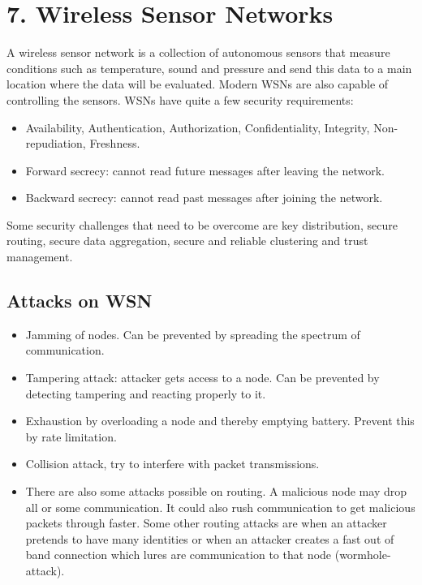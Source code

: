 \documentclass{article}
\begin{document}
\section*{7. Wireless Sensor Networks}
A wireless sensor network is a collection of autonomous sensors that measure conditions such as temperature, sound and pressure and send this data to a main location where the data will be evaluated. Modern WSNs are also capable of controlling the sensors. WSNs have quite a few security requirements:

\begin{itemize}
\item Availability, Authentication, Authorization, Confidentiality, Integrity, Non-repudiation, Freshness.
\item Forward secrecy: cannot read future messages after leaving the network.
\item Backward secrecy: cannot read past messages after joining the network.
\end{itemize}

Some security challenges that need to be overcome are key distribution, secure routing, secure data aggregation, secure and reliable clustering and trust management. 

\subsection*{Attacks on WSN~\cite{wang2006survey}}

\begin{itemize}
\item Jamming of nodes. Can be prevented by spreading the spectrum of communication.
\item Tampering attack: attacker gets access to a node. Can be prevented by detecting tampering and reacting properly to it.
\item Exhaustion by overloading a node and thereby emptying battery. Prevent this by rate limitation.
\item Collision attack, try to interfere with packet transmissions.
\item There are also some attacks possible on routing. A malicious node may drop all or some communication. It could also rush communication to get malicious packets through faster. Some other routing attacks are when an attacker pretends to have many identities or when an attacker creates a fast out of band connection which lures are communication to that node (wormhole-attack).
\end{itemize}
\end{document}
